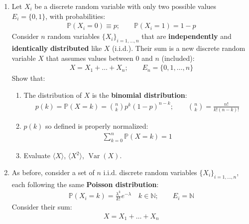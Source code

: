 \documentclass[../template.tex]{subfiles}
\begin{document}
\begin{exo}\label{ex:moments-discrete}
    \begin{enumerate}[label=\alph*.]
        \item Let $X_i$ be a discrete random variable with only two possible values $E_i=\{0,1\}$, with probabilities:
        \begin{align*}
            \mathbb{P}(X_i=0) \equiv p; \qquad \mathbb{P}(X_i=1) = 1-p    
        \end{align*}
        Consider $n$ random variables $\{X_i\}_{i=1,\dots,n}$ that are \textbf{independently} and \textbf{identically} \textbf{distributed} like $X$ (i.i.d.). Their sum is a new discrete random variable $X$ that assumes values between $0$ and $n$ (included):
        \begin{align*}
            X = X_1 + \dots + X_n; \qquad E_n = \{0,1,\dots, n\}
        \end{align*}
        Show that:
        \begin{enumerate}[label=\roman*.]
            \item The distribution of $X$ is the \textbf{binomial distribution}:
            \begin{align} \label{eqn:binomial-dist}
                p(k) = \mathbb{P}(X=k) = {n\choose k} p^k (1-p)^{n-k}; \qquad {n\choose k} = \frac{n!}{k! (n-k)!} 
            \end{align}
            \item $p(k)$ so defined is properly normalized:
            \begin{align*}
                \sum_{k=0}^n \mathbb{P}(X=k) = 1
            \end{align*}
            \item Evaluate $\langle X \rangle$, $\langle X^2 \rangle$, $\operatorname{Var}(X)$. 
        \end{enumerate}
        \item As before, consider a set of $n$ i.i.d. discrete random variables $\{X_i\}_{i=1,\dots,n}$, each following the same \textbf{Poisson distribution}:
        \begin{align} \label{eqn:poisson-dist}
            \mathbb{P}(X_i = k) = \frac{\lambda^k}{k!} e^{-\lambda} \quad k \in \mathbb{N}; \qquad E_i = \mathbb{N} 
        \end{align}  
        Consider their sum:
        \begin{align*}
            X=X_1 + \dots + X_n
        \end{align*}

\end{enumerate}
\end{exo}
\end{document}
